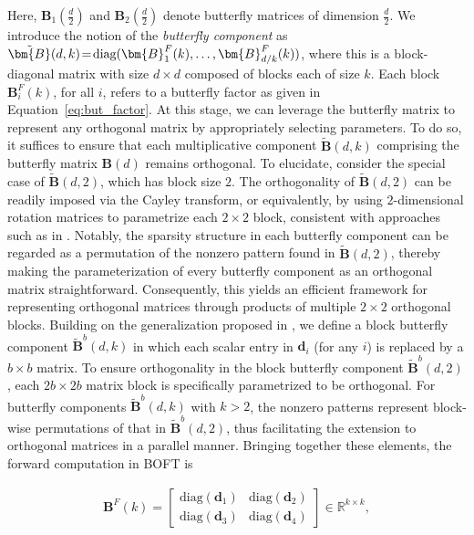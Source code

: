 Here, $\bm{B}_1(\frac{d}{2})$ and $\bm{B}_2(\frac{d}{2})$ denote butterfly matrices of dimension $\frac{d}{2}$. We introduce the notion of the \emph{butterfly component} as $\thickmuskip=2mu \medmuskip=2mu \tilde{\bm{B}}(d,k)=\text{diag}(\bm{B}^F_1(k),\ldots,\bm{B}^F_{d/k}(k))$, where this is a block-diagonal matrix with size $d\times d$ composed of blocks each of size $k$. Each block $\bm{B}^F_i(k)$, for all $i$, refers to a butterfly factor as given in Equation~\ref{eq:but_factor}. At this stage, we can leverage the butterfly matrix to represent any orthogonal matrix by appropriately selecting parameters. To do so, it suffices to ensure that each multiplicative component $\tilde{\bm{B}}(d,k)$ comprising the butterfly matrix $\bm{B}(d)$ remains orthogonal. To elucidate, consider the special case of $\tilde{\bm{B}}(d,2)$, which has block size $2$. The orthogonality of $\tilde{\bm{B}}(d,2)$ can be readily imposed via the Cayley transform, or equivalently, by using $2$-dimensional rotation matrices to parametrize each $2\times 2$ block, consistent with approaches such as in \cite{liu2021orthogonal,qiu2023controlling}. Notably, the sparsity structure in each butterfly component can be regarded as a permutation of the nonzero pattern found in $\tilde{\bm{B}}(d,2)$, thereby making the parameterization of every butterfly component as an orthogonal matrix straightforward. Consequently, this yields an efficient framework for representing orthogonal matrices through products of multiple $2\times 2$ orthogonal blocks. Building on the generalization proposed in \cite{chen2022pixelated}, we define a block butterfly component $\tilde{\bm{B}}^b(d,k)$ in which each scalar entry in $\bm{d}_i$ (for any $i$) is replaced by a $b\times b$ matrix. To ensure orthogonality in the block butterfly component $\tilde{\bm{B}}^b(d,2)$, each $2b\times 2b$ matrix block is specifically parametrized to be orthogonal. For butterfly components $\tilde{\bm{B}}^b(d,k)$ with $k>2$, the nonzero patterns represent block-wise permutations of that in $\tilde{\bm{B}}^b(d,2)$, thus facilitating the extension to orthogonal matrices in a parallel manner. Bringing together these elements, the forward computation in BOFT is

\begin{equation}\label{eq:but_factor}
\begin{aligned}
    \bm{B}^F(k)=\begin{bmatrix}
    \text{diag}(\bm{d}_1) & \text{diag}(\bm{d}_2) \\
    \text{diag}(\bm{d}_3) & \text{diag}(\bm{d}_4)
    \end{bmatrix}\in\mathbb{R}^{k\times k},
\end{aligned}
\end{equation}


